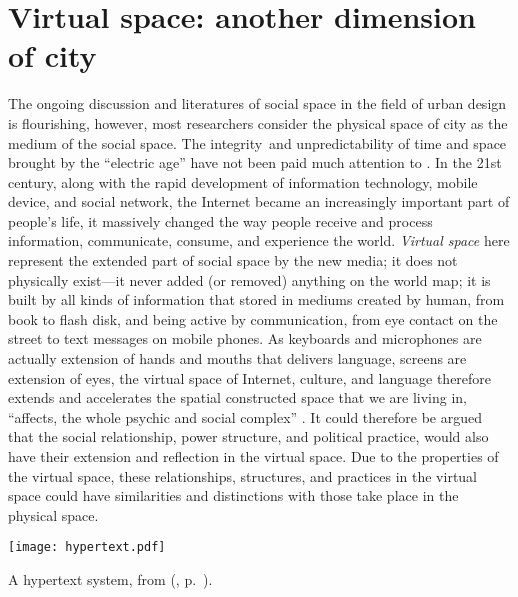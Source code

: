 \section{Virtual space: another dimension of city}

The ongoing discussion and literatures of social space in the field of urban design is flourishing, however, most researchers consider the physical space of city as the medium of the social space. The integrity\ and unpredictability of time and space brought by the ``electric age'' have not been paid much attention to \citep[p.~4]{mcluhan_introduction_1994}. In the 21st century, along with the rapid development of information technology, mobile device, and social network, the Internet became an increasingly important part of people's life, it massively changed the way people receive and process information, communicate, consume, and experience the world. \textit{Virtual space} here represent the extended part of social space by the new media; it does not physically exist---it never added (or removed) anything on the world map; it is built by all kinds of information that stored in mediums created by human, from book to flash disk, and being active by communication, from eye contact on the street to text messages on mobile phones. As keyboards and microphones are actually extension of hands and mouths that delivers language, screens are extension of eyes, the virtual space of Internet, culture, and language therefore extends and accelerates the spatial constructed space that we are living in, ``affects, the whole psychic and social complex'' \citep[p.~4]{mcluhan_introduction_1994}. It could therefore be argued that the social relationship, power structure, and political practice, would also have their extension and reflection in the virtual space. Due to the properties of the virtual space, these relationships, structures, and practices in the virtual space could have similarities and distinctions with those take place in the physical space.
\begin{marginfigure}
	\texttt{[image: hypertext.pdf]}
	\caption[A Hypertext system]{A hypertext system, from \citeauthor{nelson_computer_1974} (\citeyear{nelson_computer_1974}, p.~).}
	\label{fig:hypertext}
\end{marginfigure}

